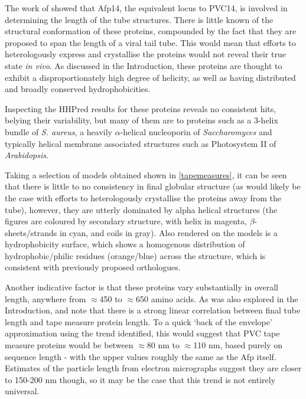 The work of \cite{Rybakova2015} showed that Afp14, the equivalent locus to PVC14, is involved in determining the length of the tube structures. There is little known of the structural conformation of these proteins, compounded by the fact that they are proposed to span the length of a viral tail tube. This would mean that efforts to heterologously express and crystallise the proteins would not reveal their true state \emph{in vivo}. As discussed in the Introduction, these proteins are thought to exhibit a disproportionately high degree of helicity, as well as having distributed and broadly conserved hydrophobicities.

Inspecting the HHPred results for these proteins reveals no consistent hits, belying their variability, but many of them are to proteins such as a 3-helix bundle of \emph{S. aureus}, a heavily $\alpha$-helical nucleoporin of \emph{Saccharomyces} and typically helical membrane associated structures such as Photosystem II of \emph{Arabidopsis}.

Taking a selection of models obtained shown in \vref{tapemeasures}, it can be seen that there is little to no consistency in final globular structure (as would likely be the case with efforts to heterologously crystallise the proteins away from the tube), however, they are utterly dominated by alpha helical structures (the figures are coloured by secondary structure, with helix in magenta, $\beta$-sheets/strands in cyan, and coils in gray). Also rendered on the models is a hydrophobicity surface, which shows a homogenous distribution of hydrophobic/philic residues (orange/blue) across the structure, which is consistent with previously proposed orthologues.

Another indicative factor is that these proteins vary substantially in overall length, anywhere from $\approx$450 to $\approx$650 amino acids. As was also explored in the Introduction, \cite{Rybakova2015} and \cite{Pedulla2003} note that there is a strong linear correlation between final tube length and tape measure protein length. To a quick `back of the envelope' approximation using the trend identified, this would suggest that PVC tape measure proteins would be between $\approx$80 nm to $\approx$110 nm, based purely on sequence length - with the upper values roughly the same as the Afp itself. Estimates of the particle length from electron micrographs suggest they are closer to 150-200 nm though, so it may be the case that this trend is not entirely universal.

